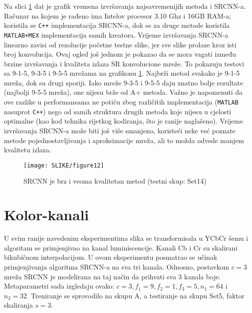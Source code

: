 \documentclass[12pt]{report}
\numberwithin{equation}{section}
\begin{document}
  Na slici \ref{fig:12ogled} dat je grafik vremena izvršavanja najsavremenijih metoda i SRCNN-a. Računar na kojem je rađeno ima Intelov procesor 3.10 Ghz i 16GB RAM-a; koristila se \texttt{C++} implementacija SRCNN-a, dok se za druge metode koristila \texttt{MATLAB+MEX} implementacija samih kreatora.  
  Vrijeme izvršavanja SRCNN-a linearno zavisi od rezolucije početne testne slike, jer sve slike prolaze kroz isti broj konvolucija. Ovaj ogled još jednom je pokazao da se mora vagati između brzine izvršavanja i kvaliteta izlaza SR konvolucione mreže. To pokazuju testovi sa 9-1-5, 9-3-5 i 9-5-5 mrežama na grafikonu \ref{fig:12ogled}. Najbrži metod svakako je 9-1-5 mreža, dok su drugi sporiji. Iako mreže 9-3-5 i 9-5-5 daju znatno bolje rezultate (najbolji 9-5-5 mreža), one nijesu brže od A+ metoda. Važno je napomenuti da ove razlike u performansama ne potiču zbog različitih implementacija (\texttt{MATLAB} nasuprot \texttt{C++}) nego od samih struktura drugih metoda koje nijesu u cjelosti optimalne (kao kod tehnika rijetkog kodiranja, što je ranije naglašeno). Vrijeme izvršavanja SRCNN-a može biti još više smanjeno, koristeći neke već poznate metode pojednostavljivanja i aproksimacije mreža, ali to možda odvede manjem kvalitetu izlaza. 
  
  
   
\begin{figure}[h]
\texttt{[image: SLIKE/figure12]}
\centering
\caption{SRCNN je brz i veoma kvalitetan metod (testni skup: Set14)}
\label{fig:12ogled}
\end{figure}
   
   
  \section{Kolor-kanali}
  
  U svim ranije navedenim eksperimentima slika se transformisala u YCbCr šemu i algoritam se primjenjivao na kanal luminiscencije. Kanali Cb i Cr su skalirani bikubičnom interpolacijom. U ovom eksperimentu posmatrao se učinak primjenjivanja algoritma SRCNN-a na sva tri kanala. Odnosno, postavkom $c=3$ mreža SRCNN je modelirana na taj način da prihvati sva 3 kanala boje. Metaparametri sada izgledaju ovako: $c = 3, f_1 = 9, f_2 = 1, f_3 = 5, n_1 = 64$ i $n_2 = 32$. Treniranje se sprovodilo na skupu A, a testiranje na skupu Set5, faktor skaliranja $s=3$. 
   
\end{document}
